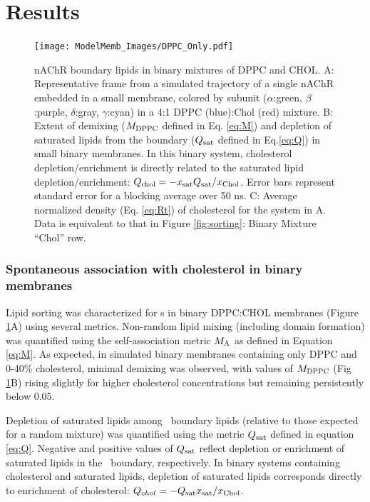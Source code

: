 \section{Results}
\label{S:3}
\begin{figure}[h!]
	{
	\texttt{[image: ModelMemb\_Images/DPPC\_Only.pdf]} }
	\caption[nAChR boundary lipids in binary mixtures of DPPC and CHOL.] {nAChR boundary lipids in binary mixtures of DPPC and CHOL. A: Representative frame from a simulated trajectory of a single nAChR embedded in a small membrane, colored by subunit ($\alpha$:green, $\beta$:purple, $\delta$:gray, $\gamma$:cyan) in a 4:1 DPPC (blue):Chol (red) mixture.  B: Extent of demixing ($M_{\mathrm{DPPC}}$ defined in Eq. \ref{eq:M}) and depletion of saturated lipids from the boundary ($Q_{\mathrm{sat}}$ defined in Eq.\ref{eq:Q}) in small binary membranes. In this binary system, cholesterol depletion/enrichment is directly related to the saturated lipid depletion/enrichment: $Q_\mathrm{chol}=-x_{\mathrm{sat}} Q_{\mathrm{sat}}/x_{\mathrm{Chol}}$.  Error bars represent standard error for a blocking average over 50 ns. C: Average normalized density (Eq. \ref{eq:Rt}) of cholesterol for the system in A. Data is equivalent to that in Figure \ref{fig:sorting}: Binary Mixture ``Chol'' row.}%
	\label{fig:binary}
\end{figure} 
\subsubsection {Spontaneous association with cholesterol in binary membranes} \label{binary}

Lipid sorting was characterized for \nachr s in binary DPPC:CHOL membranes (Figure \ref{fig:binary}A)  using several metrics. 
Non-random lipid mixing (including domain formation) was quantified using the self-association metric $M_{\mathrm{A}}$ as defined in Equation \ref{eq:M}. 
As expected, in simulated binary membranes containing only DPPC and 0-40\% cholesterol, minimal demixing was observed, with values of $M_{\mathrm{DPPC}}$ (Fig \ref{fig:binary}B) rising slightly for higher cholesterol concentrations but remaining persistently below 0.05.  

Depletion of saturated lipids among \nachr~boundary lipids (relative to those expected for a random mixture) was quantified using the metric $Q_{\mathrm{sat}}$ defined in equation \ref{eq:Q}. Negative and positive values of $Q_{\mathrm{sat}}$ reflect depletion or enrichment of saturated lipids in the \nachr~boundary, respectively. In binary systems containing cholesterol and saturated lipids, depletion of saturated lipids corresponds directly to enrichment of cholesterol: $Q_{chol} = -Q_{\mathrm{sat}} x_\mathrm{sat}/x_{\mathrm{Chol}}$. 

